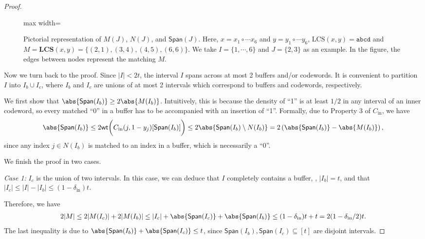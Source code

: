 \documentclass[10pt,a4paper]{article}
\theoremstyle{remark}
\newcommand{\ie}{\text{i.e.}\xspace}
\newcommand{\tuple}[1]{\ensuremath{\left(#1\right)}}
\newcommand{\tp}{\tuple}
\newcommand{\authnote}[3]{\textcolor{#2}{{\sf (#1's Note: {\sl{#3}})}}}
\newcommand{\knote}{\authnote{Kuan}{cyan}}
\newcommand{\authnote}{}
\newcommand{\knote}[1]{}
\newcommand{\Cin}{C_{\text{in}}}
\newcommand{\din}{\delta_{\text{in}}}
\newcommand{\lcs}{\ensuremath{\mathrm{LCS}}\xspace}
\newcommand{\LCS}{\ensuremath{\mathbf{LCS}}\xspace}
\newcommand{\Span}{\textsf{Span}}
\begin{document}
\begin{proof}
\begin{figure}[tp]
\begin{center}
\begin{adjustbox}{max width={\linewidth}}
\begin{tikzpicture}[>={stealth}, square/.style={regular polygon,regular polygon sides=4}]
\end{tikzpicture}
\end{adjustbox}
\end{center}
\caption{Pictorial representation of $M(J)$, $N(J)$, and $\Span(J)$. Here, $x = x_1 \circ \cdots x_6$ and $y = y_1 \circ \cdots y_6$, $\lcs(x,y) = \texttt{abcd}$ and $M = \LCS(x,y) = \{ (2,1), (3,4), (4,5), (6,6) \}$. We take $I = \{1,\cdots, 6\}$ and $J = \{2,3\}$ as an example. In the figure, the edges between nodes represent the matching $M$.}\label{fig:wrldc-notation}
\end{figure}

Now we turn back to the proof. 
Since $|I|< 2t$, the interval $I$ spans across at most 2 buffers and/or codewords. 
It is convenient to partition $I$ into $I_b \cup I_c$, where $I_b$ and $I_c$ are unions of at most 2 intervals which correspond to buffers and codewords, respectively.  

We first show that $\abs{\textsf{Span}(I_b)} \ge 2\abs{M(I_b)}$. Intuitively, this is because the density of ``1'' is at least $1/2$ in any interval of an inner codeword, so every matched ``0'' in a buffer has to be accompanied with an insertion of ``1''. Formally, due to Property 3 of $\Cin$, we have
\begin{align*}
	\abs{\textsf{Span}(I_b)} \le 2\textsf{wt}\bigg(\Cin(j, 1-y_j)[\textsf{Span}(I_b)]\bigg) \le 2\abs{\textsf{Span}(I_b) \setminus N(I_b)} = 2\tp{\abs{\textsf{Span}(I_b)} - \abs{M(I_b)}},
\end{align*}
since any index $j \in N(I_b)$ is matched to an index in a buffer, which is necessarily a ``0''. 

We finish the proof in two cases.

\textit{Case 1:} $I_c$ is the union of two intervals. 
In this case, we can deduce that $I$ completely contains a buffer, \ie, $|I_b|=t$, and that $|I_c|\le |I|-|I_b|\le (1-\din)t$. 

Therefore, we have
\begin{align*}
	2|M| \le 2|M(I_c)| + 2|M(I_b)| \le |I_c| + \abs{\textsf{Span}(I_c)} + \abs{\textsf{Span}(I_b)} \le (1-\din)t + t = 2(1-\din/2)t.
\end{align*}
The last inequality is due to $\abs{\textsf{Span}(I_b)} + \abs{\textsf{Span}(I_c)} \le t$, since $\textsf{Span}(I_b), \textsf{Span}(I_c) \subseteq [t]$ are disjoint intervals.


\end{proof}
\end{document}

